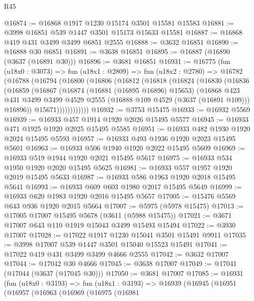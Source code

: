 \begin{lexlean}{R45}
\begin{coremodule}
@16874 := @16868 @1917 @1230 @15174 @3501 @15581 @15583
@16881 := @3998 @16851 @539 @1447 @3501 @15173 @15633 @15581
@16887 := @16868 @419 @431 @3499 @3499 @6851 @2555
@16888 := @3632 @16851
@16890 := @16888 @30 @6851
@16891 := @3638 @16851
@16895 := @16887 (@16890 (@3637 (@16891 @30)))
@16896 := @3681 @16851
@16931 := @16775
    (fun (u18x0 : @3073) =>
    fun (u18x1 : @2809) =>
    fun (u18x2 : @2780) =>
    @16782
      (@16788
        (@16794
          (@16800
            (@16806
              (@16812
                (@16818
                  (@16824
                    (@16830
                      (@16836
                        (@16859
                          (@16867
                            (@16874
                              (@16881 (@16895 @16896) @15653)
                              (@16868
                                @423
                                @431
                                @3499
                                @3499
                                @4529
                                @2555
                                (@16888 @109 @4529 (@3637 (@16891 @109)))
                                @16896))
                            @15671))))))))))))
@16932 := @3753 @15475
@16933 := @16932 @5569
@16939 := @16933 @457 @1914 @1920 @2026 @15495 @5577
@16945 := @16933 @471 @1925 @1920 @2025 @15495 @5585
@16951 := @16933 @482 @1930 @1920 @2024 @15495 @5593
@16957 := @16933 @493 @1936 @1920 @2023 @15495 @5601
@16963 := @16933 @506 @1940 @1920 @2022 @15495 @5609
@16969 := @16933 @519 @1944 @1920 @2021 @15495 @5617
@16975 := @16933 @534 @1950 @1920 @2020 @15495 @5625
@16981 := @16933 @557 @1957 @1920 @2019 @15495 @5633
@16987 := @16933 @586 @1963 @1920 @2018 @15495 @5641
@16993 := @16933 @609 @603 @1980 @2017 @15495 @5649
@16999 := @16933 @620 @1983 @1920 @2016 @15495 @5657
@17005 := @15476 @5569 @643 @936 @1920 @2015 @5664
@17007 := @5975 (@5978 @15475)
@17013 := @17005 @17007 @15495 @5678 (@3611 (@5988 @15475))
@17021 := @3671 @17007 @643 @110 @1919 @15043 @3499 @15493 @15494
@17022 := @3930 @17007
@17028 := @17022 @1917 @1230 @15041 @3501 @15491 @9911
@17035 := @3998 @17007 @539 @1447 @3501 @15040 @15523 @15491
@17041 := @17022 @419 @431 @3499 @3499 @4666 @2555
@17042 := @3632 @17007
@17044 := @17042 @30 @4666
@17045 := @3638 @17007
@17049 := @17041 (@17044 (@3637 (@17045 @30)))
@17050 := @3681 @17007
@17085 := @16931
    (fun (u18x0 : @3193) =>
    fun (u18x1 : @3193) =>
    @16939
      (@16945
        (@16951
          (@16957
            (@16963
              (@16969
                (@16975
                  (@16981

\end{coremodule}
\end{lexlean}
